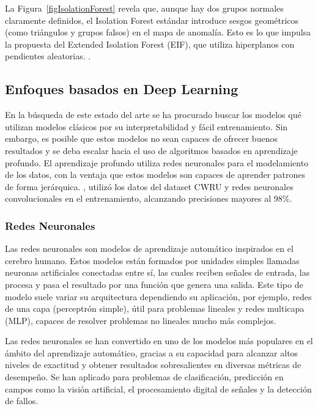 \documentclass[11pt,a4paper,spanish]{book}
\numberwithin{equation}{chapter}
\numberwithin{figure}{chapter}
\begin{document}
La Figura~\ref{figIsolationForest} revela que, aunque hay dos grupos normales claramente definidos, el Isolation Forest estándar introduce sesgos geométricos (como triángulos y grupos falsos) en el mapa de anomalía. Esto es lo que impulsa la propuesta del Extended Isolation Forest (EIF), que utiliza hiperplanos con pendientes aleatorias. \cite{liu2021isoletionforest}.


\subsection{Enfoques basados en Deep Learning}

En la búsqueda de este estado del arte se ha procurado buscar los modelos qué utilizan modelos clásicos por su interpretabilidad y fácil entrenamiento. Sin embargo, es posible que estos modelos no sean capaces de ofrecer buenos resultados y se deba escalar hacia el uso de algoritmos basados en aprendizaje profundo. El aprendizaje profundo utiliza redes neuronales para el modelamiento de los datos, con la ventaja que estos modelos son capaces de aprender patrones de forma jerárquica. \cite{raj2024bearing}, utilizó los datos del dataset CWRU y redes neuronales convolucionales en el entrenamiento, alcanzando precisiones mayores al 98\%.


\subsubsection{Redes Neuronales}

Las redes neuronales son modelos de aprendizaje automático inspirados en el cerebro humano. Estos modelos están formados por unidades simples llamadas neuronas artificiales conectadas entre sí, las cuales reciben señales de entrada, las procesa y pasa el resultado por una función que genera una salida. Este tipo de modelo suele variar su arquitectura dependiendo su aplicación, por ejemplo, redes de una capa (perceptrón simple), útil para problemas lineales y redes multicapa (MLP), capaces de resolver problemas no lineales mucho más complejos.


Las redes neuronales se han convertido en uno de los modelos más populares en el ámbito del aprendizaje automático, gracias a su capacidad para alcanzar altos niveles de exactitud y obtener resultados sobresalientes en diversas métricas de desempeño. Se han aplicado para problemas de clasificación, predicción en campos como la visión artificial, el procesamiento digital de señales y la detección de fallos. 
\end{document}
